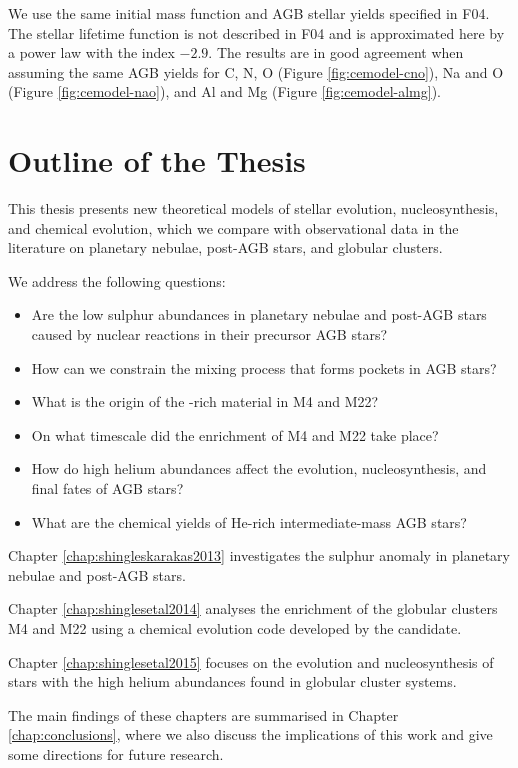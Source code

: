 We use the same \citet{Kroupa:1993tm} initial mass function and AGB stellar yields specified in F04. The stellar lifetime function is not described in F04 and is approximated here by a power law with the index $-2.9$. The results are in good agreement when assuming the same AGB yields for C, N, O (Figure \ref{fig:cemodel-cno}), Na and O (Figure \ref{fig:cemodel-nao}), and Al and Mg (Figure \ref{fig:cemodel-almg}).

\section{Outline of the Thesis}
This thesis presents new theoretical models of stellar evolution, nucleosynthesis, and chemical evolution, which we compare with observational data in the literature on planetary nebulae, post-AGB stars, and globular clusters.

We address the following questions:
\begin{itemize}
  \item Are the low sulphur abundances in planetary nebulae and post-AGB stars caused by nuclear reactions in their precursor AGB stars?
  \item How can we constrain the mixing process that forms  pockets in AGB stars?
  \item What is the origin of the \sprocess-rich material in M4 and M22?
  \item On what timescale did the \sprocess enrichment of M4 and M22 take place?
  \item How do high helium abundances affect the evolution, nucleosynthesis, and final fates of AGB stars?
  \item What are the chemical yields of He-rich intermediate-mass AGB stars?
\end{itemize}

Chapter \ref{chap:shingleskarakas2013} investigates the sulphur anomaly in planetary nebulae and post-AGB stars.

Chapter \ref{chap:shinglesetal2014} analyses the \sprocess enrichment of the globular clusters M4 and M22 using a chemical evolution code developed by the candidate.

Chapter \ref{chap:shinglesetal2015} focuses on the evolution and nucleosynthesis of stars with the high helium abundances found in globular cluster systems.

The main findings of these chapters are summarised in Chapter \ref{chap:conclusions}, where we also discuss the implications of this work and give some directions for future research.
